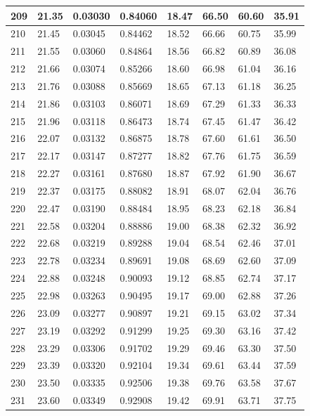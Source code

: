 \documentclass[12pt,a4paper,twoside]{article}
\begin{document}
\begin{center}
\begin{longtable}{l l l l | l l l l}
209 & 21.35 & 0.03030 & 0.84060 & 18.47 & 66.50 & 60.60 & 35.91 \\ \hline
210 & 21.45 & 0.03045 & 0.84462 & 18.52 & 66.66 & 60.75 & 35.99 \\ \hline
211 & 21.55 & 0.03060 & 0.84864 & 18.56 & 66.82 & 60.89 & 36.08 \\ \hline
212 & 21.66 & 0.03074 & 0.85266 & 18.60 & 66.98 & 61.04 & 36.16 \\ \hline
213 & 21.76 & 0.03088 & 0.85669 & 18.65 & 67.13 & 61.18 & 36.25 \\ \hline
214 & 21.86 & 0.03103 & 0.86071 & 18.69 & 67.29 & 61.33 & 36.33 \\ \hline
215 & 21.96 & 0.03118 & 0.86473 & 18.74 & 67.45 & 61.47 & 36.42 \\ \hline
216 & 22.07 & 0.03132 & 0.86875 & 18.78 & 67.60 & 61.61 & 36.50 \\ \hline
217 & 22.17 & 0.03147 & 0.87277 & 18.82 & 67.76 & 61.75 & 36.59 \\ \hline
218 & 22.27 & 0.03161 & 0.87680 & 18.87 & 67.92 & 61.90 & 36.67 \\ \hline
219 & 22.37 & 0.03175 & 0.88082 & 18.91 & 68.07 & 62.04 & 36.76 \\ \hline
220 & 22.47 & 0.03190 & 0.88484 & 18.95 & 68.23 & 62.18 & 36.84 \\ \hline
221 & 22.58 & 0.03204 & 0.88886 & 19.00 & 68.38 & 62.32 & 36.92 \\ \hline
222 & 22.68 & 0.03219 & 0.89288 & 19.04 & 68.54 & 62.46 & 37.01 \\ \hline
223 & 22.78 & 0.03234 & 0.89691 & 19.08 & 68.69 & 62.60 & 37.09 \\ \hline
224 & 22.88 & 0.03248 & 0.90093 & 19.12 & 68.85 & 62.74 & 37.17 \\ \hline
225 & 22.98 & 0.03263 & 0.90495 & 19.17 & 69.00 & 62.88 & 37.26 \\ \hline
226 & 23.09 & 0.03277 & 0.90897 & 19.21 & 69.15 & 63.02 & 37.34 \\ \hline
227 & 23.19 & 0.03292 & 0.91299 & 19.25 & 69.30 & 63.16 & 37.42 \\ \hline
228 & 23.29 & 0.03306 & 0.91702 & 19.29 & 69.46 & 63.30 & 37.50 \\ \hline
229 & 23.39 & 0.03320 & 0.92104 & 19.34 & 69.61 & 63.44 & 37.59 \\ \hline
230 & 23.50 & 0.03335 & 0.92506 & 19.38 & 69.76 & 63.58 & 37.67 \\ \hline
231 & 23.60 & 0.03349 & 0.92908 & 19.42 & 69.91 & 63.71 & 37.75 \\ \hline

\end{longtable}
\end{center}
\end{document}
